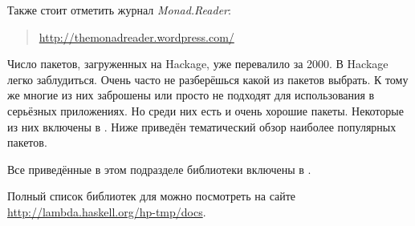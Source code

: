 Также стоит отметить журнал \emph{Monad.Reader}:

\begin{quote}
\url{http://themonadreader.wordpress.com/}
\end{quote}

\newpage


Число пакетов, загруженных на Hackage, уже перевалило за 
2000. В Hackage легко заблудиться. 
Очень часто не разберёшься какой из пакетов
выбрать. К тому же многие из них заброшены или просто 
не подходят для использования в серьёзных приложениях. 
Но среди них есть и очень хорошие пакеты. Некоторые
из них включены в . 
Ниже приведён тематический обзор наиболее популярных пакетов.


Все приведённые в этом подразделе библиотеки включены
в .

Полный список библиотек для 
можно посмотреть на сайте \url{http://lambda.haskell.org/hp-tmp/docs}.

